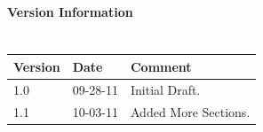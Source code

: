 \documentclass[11pt]{article}
\begin{document}
\tableofcontents			%
\setcounter{tocdepth}{1}		%

\newpage
\paragraph{Version Information\\\\} 
\begin{tabular}{|p{1.5cm}|p{1.5cm}|p{10cm}|} \hline
Version & Date & Comment \\ \hline
1.0 & 09-28-11 & Initial Draft. \\
1.1 & 10-03-11 & Added More Sections.\\

\hline
\end{tabular}

\newpage
{}
\setcounter{page}{1}

						

\newpage














\newpage

						
\end{document}
